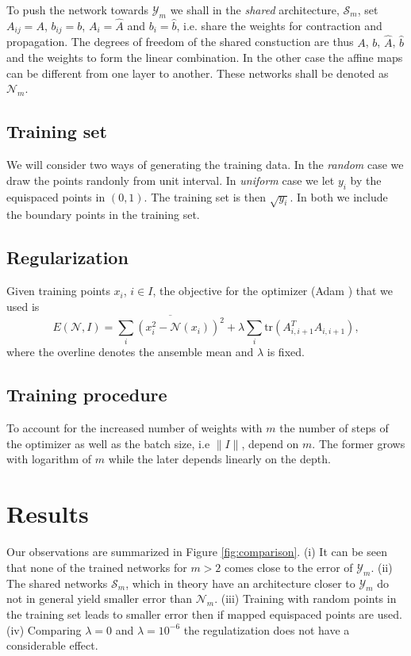 \documentclass[onetab, a4paper]{siamart171218}
\newcommand{\norm}[1]{\lVert#1\rVert}
\theoremstyle{remark}
\begin{document}
To push the network towards $\mathcal{Y}_m$ we shall in the \emph{shared}
architecture, $\mathcal{S}_m$, set $A_{ij}=A$, $b_{ij}=b$, $A_{i}=\hat{A}$ and $b_{i}=\hat{b}$,
i.e. share the weights for contraction and propagation. The degrees of freedom
of the shared constuction are thus $A$, $b$, $\hat{A}$, $\hat{b}$ and the weights
to form the linear combination. In the other case the affine maps can be
different from one layer to another. These networks shall be denoted as
$\mathcal{N}_m$.

\subsection{Training set} We will consider two ways of generating the training
data. In the \emph{random} case we draw the points randonly from unit interval.
In \emph{uniform} case we let $y_i$ by the equispaced points in $(0, 1)$. The
training set is then $\sqrt{y_i}$. In both we include the boundary points in the
training set.

\subsection{Regularization} Given training points $x_i$, $i\in I$, the
objective for the optimizer (Adam \cite{kingma2014adam}) that we used is
\[
E(\mathcal{N}, I) = \overline{\sum_i(x^2_i - \mathcal{N}(x_i))^2} + \lambda \sum_{i}\text{tr}(A^T_{i, i+1} A_{i, i+1}),
\]
where the overline denotes the ansemble mean and $\lambda$ is fixed.

\subsection{Training procedure} To account for the increased number of
weights with $m$ the number of steps of the optimizer as well as the batch
size, i.e $\norm{I}$, depend on $m$. The former grows with logarithm of
$m$ while the later depends linearly on the depth.

\section{Results} Our observations are summarized in Figure \ref{fig:comparison}.
(i) It can be seen that none of the trained networks for $m>2$ comes close to the
error of $\mathcal{Y}_m$. (ii) The shared networks $\mathcal{S}_m$, which
in theory have an architecture closer to $\mathcal{Y}_m$ do not in general yield
smaller error than $\mathcal{N}_m$. (iii) Training with random points in the training
set leads to smaller error then if mapped equispaced points are used. (iv) Comparing
$\lambda=0$ and $\lambda=10^{-6}$ the regulatization does not have a considerable
effect.
\end{document}
